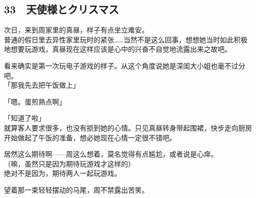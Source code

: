 \subsection{33　天使様とクリスマス}

次日，来到周家里的真昼，样子有点坐立难安。\\

普通的假日里去异性家里玩时的紧张……当然不是这么回事，想想她当时如此积极地想要玩游戏，真昼现在这样应该是心中的兴奋不自觉地流露出来之故吧。

看来确实是第一次玩电子游戏的样子。从这个角度说她是深闺大小姐也毫不过分吧。\\

「那我先去把午饭做上」

「嗯。蛋煎熟点啊」

「知道了啦」\\

就算客人要求很多，也没有损到她的心情。只见真昼转身带起围裙，快步走向厨房开始做起了午饭的准备，想必她现在心情一定很不错吧。

居然这么期待啊——周这么想着，莫名觉得有点尴尬，或者说是心痒。\\

（嘛，虽然只是因为期待玩游戏才这样的）\\

绝对不是因为，期待两人一起玩游戏。

望着那一束轻轻摆动的马尾，周不禁露出苦笑。\\

